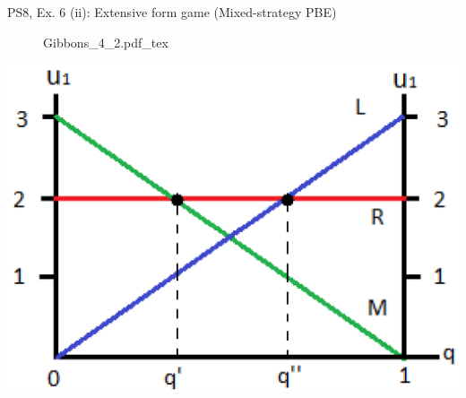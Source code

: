\begin{frame}{PS8, Ex. 6 (ii): Extensive form game (Mixed-strategy PBE)}
\begin{multicols}{2}
      \vfill\null\columnbreak
      \begin{figure}[!h]
        \center {}
        {Gibbons_4_2.pdf_tex}
      \end{figure}
      \includegraphics[width=1.1\columnwidth]{figures/Gibbons_4_2_E[u]}
      \vfill\null
    \end{multicols}
\end{frame}
